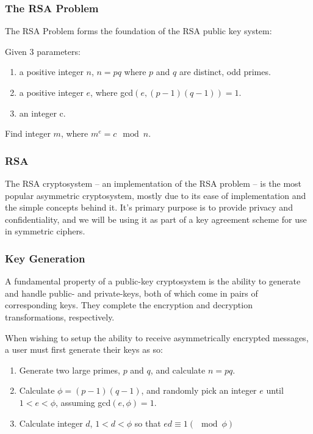     \subsubsection{The RSA Problem}
    
    The RSA Problem forms the foundation of the RSA public key system:
    
    \begin{mathdef}
      Given 3 parameters:
      \begin{enumerate}
        \item a positive integer $n$, $n=pq$ where $p$ and $q$ are distinct, odd primes.
        \item a positive integer $e$, where gcd$(e, (p-1)(q-1)) = 1$.
        \item an integer c.
      \end{enumerate} 
      Find integer $m$, where $m^e = c \mod{n}$.
    \end{mathdef}
    
    \subsubsection{RSA}
    
    The RSA cryptosystem -- an implementation of the RSA problem -- is the most popular asymmetric cryptosystem, mostly due to its ease of implementation and the simple concepts behind it. It's primary purpose is to provide privacy and confidentiality, and we will be using it as part of a key agreement scheme for use in symmetric ciphers.
     
    \subsubsection{Key Generation}
    
    A fundamental property of a public-key cryptosystem is the ability to generate and handle public- and private-keys, both of which come in pairs of corresponding keys. They complete the encryption and decryption transformations, respectively. 
    
    When wishing to setup the ability to receive asymmetrically encrypted messages, a user must first generate their keys as so:
    
    \begin{enumerate}
      \item Generate two large primes, $p$ and $q$, and calculate $n=pq$.
      \item Calculate $\phi = (p-1)(q-1)$, and randomly pick an integer $e$ until $1 < e < \phi$, assuming gcd$(e,\phi)=1$.
      \item Calculate integer $d$, $1 < d < \phi$ so that $ed \equiv 1 (\mod{\phi})$
    \end{enumerate}
    
